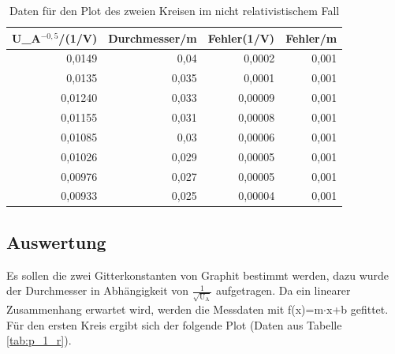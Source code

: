 \documentclass[12pt,a4paper]{article}
\begin{document}
\begin{table}[htbp]
\caption{Daten für den Plot des zweien Kreisen im nicht relativistischem Fall}
\begin{center}
\begin{tabular}{|r|r|r|r|}
\hline
\multicolumn{1}{|l|}{U\_A$^{-0,5}$/(1/V)} & \multicolumn{1}{l|}{Durchmesser/m} & \multicolumn{1}{l|}{Fehler(1/V)} & \multicolumn{1}{l|}{Fehler/m} \\ \hline
0,0149 & 0,04 & 0,0002 & 0,001 \\ \hline
0,0135 & 0,035 & 0,0001 & 0,001 \\ \hline
0,01240 & 0,033 & 0,00009 & 0,001 \\ \hline
0,01155 & 0,031 & 0,00008 & 0,001 \\ \hline
0,01085 & 0,03 & 0,00006 & 0,001 \\ \hline
0,01026 & 0,029 & 0,00005 & 0,001 \\ \hline
0,00976 & 0,027 & 0,00005 & 0,001 \\ \hline
0,00933 & 0,025 & 0,00004 & 0,001 \\ \hline
\end{tabular}
\end{center}
\label{tab:p_2}
\end{table}


\subsection{Auswertung}

Es sollen die zwei Gitterkonstanten von Graphit bestimmt werden, dazu wurde der Durchmesser in Abhängigkeit von $\frac{1}{\sqrt{\text{U}_{\text{A}}}}$ aufgetragen. Da ein linearer Zusammenhang erwartet wird, werden die Messdaten mit f(x)=m$\cdot$x+b gefittet.
Für den ersten Kreis ergibt sich der folgende Plot (Daten aus Tabelle \ref{tab:p_1_r}).
\end{document}
